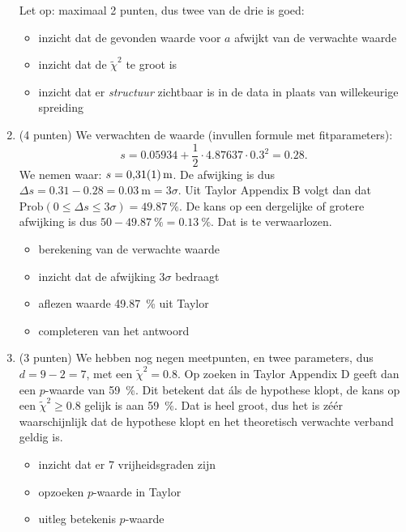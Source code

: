 \documentclass[a4paper,11pt]{article}
\begin{document}
\begin{enumerate}
  Let op: maximaal 2 punten, dus twee van de drie is goed:
  \begin{itemize}
    \item inzicht dat de gevonden waarde voor $a$ afwijkt van de verwachte waarde
    \item inzicht dat de $\tilde\chi^2$ te groot is
    \item inzicht dat er \emph{structuur} zichtbaar is in de data in plaats van willekeurige spreiding
  \end{itemize}
  \item (4 punten) We verwachten de waarde (invullen formule met fitparameters):
  \begin{equation*}
    s = \num{0,05934} + \frac{1}{2}\cdot \num{4,87637}\cdot \num{0,3}^2 = \num{0,28}.
  \end{equation*}
  We nemen waar: $s = \SI{0,31 +- 0,01}{\meter}$. De afwijking is dus $\Delta s = \num{0,31} - \num{0,28} = \SI{0,03}{\meter} = 3\sigma$. Uit Taylor Appendix B volgt dan dat $\text{Prob}(0 \leq \Delta s \leq 3\sigma) = \SI{49,87}{\percent}.$ De kans op een dergelijke of grotere afwijking is dus $50 - \SI{49,87}{\percent} = \SI{0,13}{\percent}$. Dat is te verwaarlozen.
  \begin{itemize}
    \item berekening van de verwachte waarde
    \item inzicht dat de afwijking $3\sigma$ bedraagt
    \item aflezen waarde \SI{49,87}{\percent} uit Taylor
    \item completeren van het antwoord
  \end{itemize}
  \item (3 punten) We hebben nog negen meetpunten, en twee parameters, dus $d = 9 - 2 = 7$, met een $\tilde\chi^2 = \num{0,8}$. Op zoeken in Taylor Appendix D geeft dan een $p$-waarde van \SI{59}{\percent}. Dit betekent dat áls de hypothese klopt, de kans op een $\tilde\chi^2 \geq \num{0,8}$ gelijk is aan \SI{59}{\percent}. Dat is heel groot, dus het is zéér waarschijnlijk dat de hypothese klopt en het theoretisch verwachte verband geldig is.
  \begin{itemize}
    \item inzicht dat er 7 vrijheidsgraden zijn
    \item opzoeken $p$-waarde in Taylor
    \item uitleg betekenis $p$-waarde
  \end{itemize}
\end{enumerate}
\end{document}
